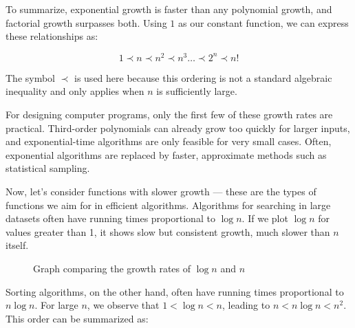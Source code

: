To summarize, exponential growth is faster than any polynomial growth, and factorial growth surpasses both. Using \(1\) as our constant function, we can express these relationships as:

\[
1 \prec n \prec n^2 \prec n^3 \ldots \prec 2^n \prec n!
\]

The symbol \( \prec \) is used here because this ordering is not a standard algebraic inequality and only applies when \( n \) is sufficiently large.

For designing computer programs, only the first few of these growth rates are practical. Third-order polynomials can already grow too quickly for larger inputs, and exponential-time algorithms are only feasible for very small cases. Often, exponential algorithms are replaced by faster, approximate methods such as statistical sampling.

Now, let's consider functions with slower growth — these are the types of functions we aim for in efficient algorithms. Algorithms for searching in large datasets often have running times proportional to \( \log n \). If we plot \( \log n \) for values greater than 1, it shows slow but consistent growth, much slower than \( n \) itself.

\begin{figure}[h]
    \centering
    \caption{Graph comparing the growth rates of $\log n$ and $n$}
\end{figure}

Sorting algorithms, on the other hand, often have running times proportional to \( n \log n \). For large \( n \), we observe that \( 1 < \log n < n \), leading to \( n < n \log n < n^2 \). This order can be summarized as:

